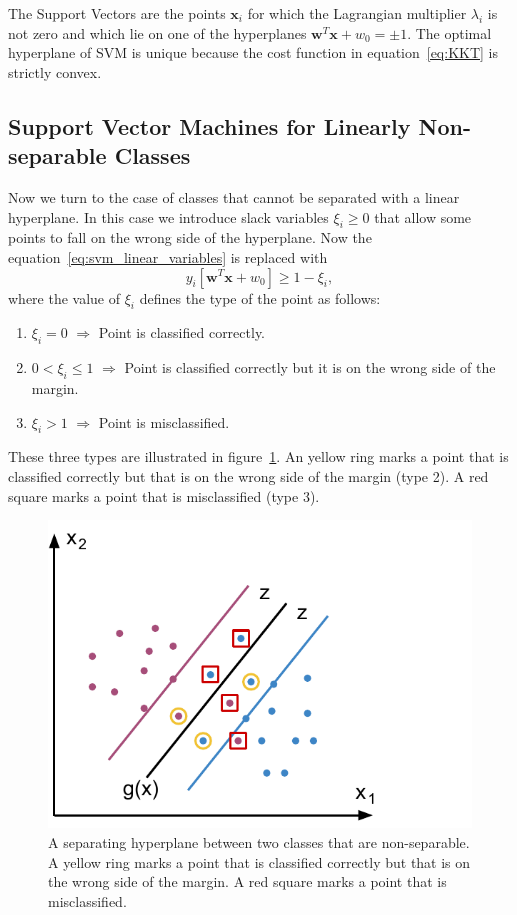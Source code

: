 The Support Vectors are the points $\mathbf{x}_i$ for which the Lagrangian multiplier $\lambda_i$ is not zero and which lie on one of the hyperplanes $\mathbf{w}^T \mathbf{x} + w_0 = \pm 1$. The optimal hyperplane of SVM is unique because the cost function in equation~\ref{eq:KKT} is strictly convex.


\subsection{Support Vector Machines for Linearly Non-separable Classes}
Now we turn to the case of classes that cannot be separated with a linear hyperplane. In this case we introduce slack variables $\xi_i \ge 0$ that allow some points to fall on the wrong side of the hyperplane. Now the equation~\ref{eq:svm_linear_variables} is replaced with
\begin{equation}
y_i [\mathbf{w}^T \mathbf{x} + w_0] \ge 1 - \xi_i,
\end{equation}  
where the value of $\xi_i$ defines the type of the point as follows:
\begin{enumerate}
\item $\xi_i = 0$ $\Rightarrow$ Point is classified correctly.
\item $0 < \xi_i \le 1$ $\Rightarrow$ Point is classified correctly but it is on the wrong side of the margin.
\item $\xi_i > 1$ $\Rightarrow$ Point is misclassified.
\end{enumerate}

These three types are illustrated in figure~\ref{fig:svm_non_separable}. An yellow ring marks a point that is classified correctly but that is on the wrong side of the margin (type 2). A red square marks a point that is misclassified (type 3).  

\begin{figure}[here]
\centering
\includegraphics[scale=0.7]{images/svm_non_separable.pdf}
\caption{A separating hyperplane between two classes that are non-separable. A yellow ring marks a point that is classified correctly but that is on the wrong side of the margin. A red square marks a point that is misclassified.}
\label{fig:svm_non_separable}
\end{figure}


